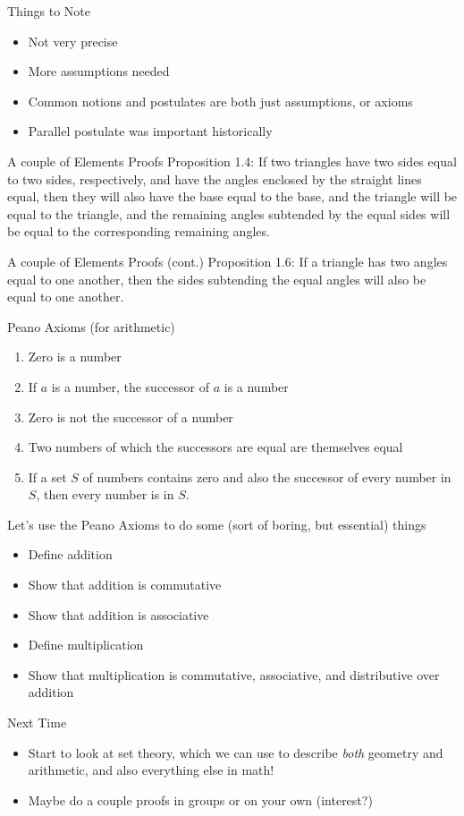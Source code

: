 \documentclass{beamer}
\begin{document}
\begin{frame}{Things to Note}
\begin{itemize}
\item Not very precise
\item More assumptions needed
\item Common notions and postulates are both just assumptions, or axioms
\item Parallel postulate was important historically
\end{itemize}
\end{frame}

\begin{frame}{A couple of Elements Proofs}
Proposition 1.4: If two triangles have two sides equal to two sides, respectively, and have the angles enclosed by the straight lines equal, then they will also have the base equal to the base, and the triangle will be equal to the triangle, and the remaining angles subtended by the equal sides will be equal to the corresponding remaining angles.
\end{frame}

\begin{frame}{A couple of Elements Proofs (cont.)}
Proposition 1.6: If a triangle has two angles equal to one another, then the sides subtending the equal angles will also be equal to one another.
\end{frame}

\begin{frame}{Peano Axioms (for arithmetic)}
\begin{enumerate}
\item Zero is a number
\item If $a$ is a number, the successor of $a$ is a number
\item Zero is not the successor of a number
\item Two numbers of which the successors are equal are themselves equal
\item If a set $S$ of numbers contains zero and also the successor of every number in $S$, then every number is in $S$.
\end{enumerate}
\end{frame}

\begin{frame}{Let's use the Peano Axioms to do some (sort of boring, but essential) things}
\begin{itemize}
\item Define addition
\item Show that addition is commutative
\item Show that addition is associative
\item Define multiplication
\item Show that multiplication is commutative, associative, and distributive over addition
\end{itemize}
\end{frame}

\begin{frame}{Next Time}
\begin{itemize}
\item Start to look at set theory, which we can use to describe \textit{both} geometry and arithmetic, and also everything else in math!
\item Maybe do a couple proofs in groups or on your own (interest?)
\end{itemize}
\end{frame}
\end{document}

